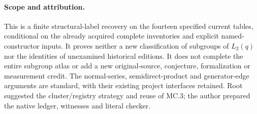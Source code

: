 \documentclass[11pt]{article}
\begin{document}
\paragraph{Scope and attribution.}
This is a finite structural-label recovery on the fourteen specified current
tables, conditional on the already acquired complete inventories and explicit
named-constructor inputs. It proves neither a new classification of subgroups
of $L_2(q)$ nor the identities of unexamined historical editions. It does not
complete the entire subgroup atlas or add a new original-source, conjecture,
formalization or measurement credit. The normal-series, semidirect-product
and generator-edge arguments are standard, with their existing project
interfaces retained. Root suggested the cluster/registry strategy and reuse
of MC.3; the author prepared the native ledger, witnesses and literal checker.
\end{document}

